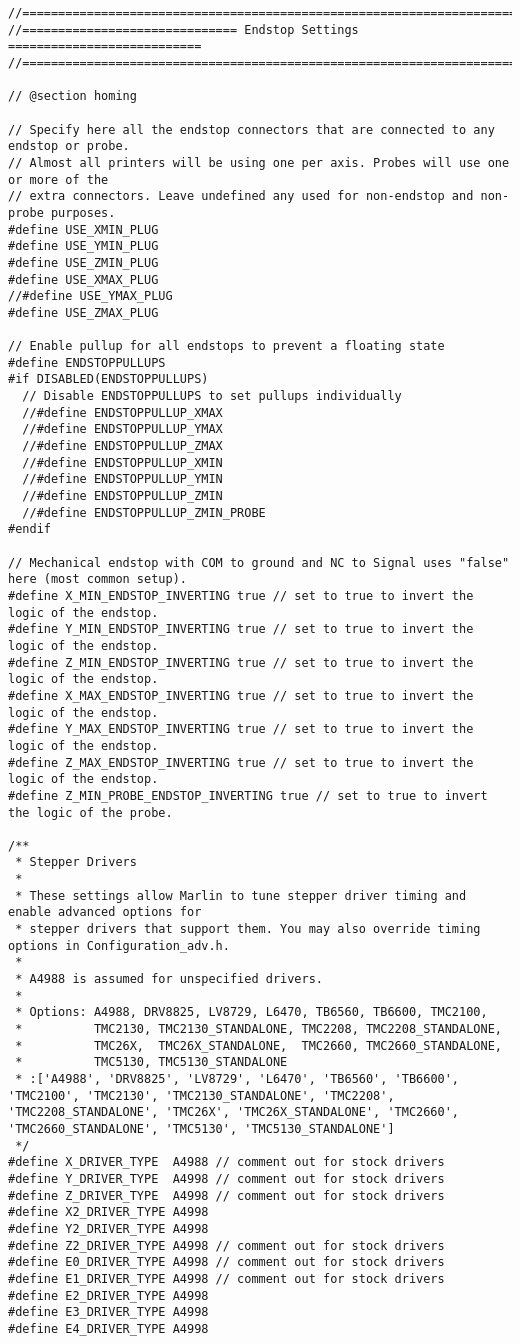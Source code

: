 \begin{lstlisting}[caption = キャプション, label = ラベル]
//===========================================================================
//============================== Endstop Settings ===========================
//===========================================================================

// @section homing

// Specify here all the endstop connectors that are connected to any endstop or probe.
// Almost all printers will be using one per axis. Probes will use one or more of the
// extra connectors. Leave undefined any used for non-endstop and non-probe purposes.
#define USE_XMIN_PLUG
#define USE_YMIN_PLUG
#define USE_ZMIN_PLUG
#define USE_XMAX_PLUG
//#define USE_YMAX_PLUG
#define USE_ZMAX_PLUG

// Enable pullup for all endstops to prevent a floating state
#define ENDSTOPPULLUPS
#if DISABLED(ENDSTOPPULLUPS)
  // Disable ENDSTOPPULLUPS to set pullups individually
  //#define ENDSTOPPULLUP_XMAX
  //#define ENDSTOPPULLUP_YMAX
  //#define ENDSTOPPULLUP_ZMAX
  //#define ENDSTOPPULLUP_XMIN
  //#define ENDSTOPPULLUP_YMIN
  //#define ENDSTOPPULLUP_ZMIN
  //#define ENDSTOPPULLUP_ZMIN_PROBE
#endif

// Mechanical endstop with COM to ground and NC to Signal uses "false" here (most common setup).
#define X_MIN_ENDSTOP_INVERTING true // set to true to invert the logic of the endstop.
#define Y_MIN_ENDSTOP_INVERTING true // set to true to invert the logic of the endstop.
#define Z_MIN_ENDSTOP_INVERTING true // set to true to invert the logic of the endstop.
#define X_MAX_ENDSTOP_INVERTING true // set to true to invert the logic of the endstop.
#define Y_MAX_ENDSTOP_INVERTING true // set to true to invert the logic of the endstop.
#define Z_MAX_ENDSTOP_INVERTING true // set to true to invert the logic of the endstop.
#define Z_MIN_PROBE_ENDSTOP_INVERTING true // set to true to invert the logic of the probe.

/**
 * Stepper Drivers
 *
 * These settings allow Marlin to tune stepper driver timing and enable advanced options for
 * stepper drivers that support them. You may also override timing options in Configuration_adv.h.
 *
 * A4988 is assumed for unspecified drivers.
 *
 * Options: A4988, DRV8825, LV8729, L6470, TB6560, TB6600, TMC2100,
 *          TMC2130, TMC2130_STANDALONE, TMC2208, TMC2208_STANDALONE,
 *          TMC26X,  TMC26X_STANDALONE,  TMC2660, TMC2660_STANDALONE,
 *          TMC5130, TMC5130_STANDALONE
 * :['A4988', 'DRV8825', 'LV8729', 'L6470', 'TB6560', 'TB6600', 'TMC2100', 'TMC2130', 'TMC2130_STANDALONE', 'TMC2208', 'TMC2208_STANDALONE', 'TMC26X', 'TMC26X_STANDALONE', 'TMC2660', 'TMC2660_STANDALONE', 'TMC5130', 'TMC5130_STANDALONE']
 */
#define X_DRIVER_TYPE  A4988 // comment out for stock drivers
#define Y_DRIVER_TYPE  A4998 // comment out for stock drivers
#define Z_DRIVER_TYPE  A4998 // comment out for stock drivers
#define X2_DRIVER_TYPE A4998
#define Y2_DRIVER_TYPE A4998
#define Z2_DRIVER_TYPE A4998 // comment out for stock drivers
#define E0_DRIVER_TYPE A4998 // comment out for stock drivers
#define E1_DRIVER_TYPE A4998 // comment out for stock drivers
#define E2_DRIVER_TYPE A4998
#define E3_DRIVER_TYPE A4998
#define E4_DRIVER_TYPE A4998


\end{lstlisting}
